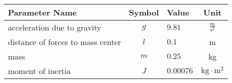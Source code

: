 \begin{tabular}{lclc}
\hline
 Parameter Name                    &  Symbol  & Value     &               Unit                \\
\hline
 acceleration due to gravity       &   $g$    & $9.81$    & $\frac{\mathrm{m}}{\mathrm{s}^2}$ \\
 distance of forces to mass center &   $l$    & $0.1$     &                 m                 \\
 mass                              &   $m$    & $0.25$    &                kg                 \\
 moment of inertia                 &   $J$    & $0.00076$ & $\mathrm{kg} \cdot \mathrm{m}^2$  \\
\hline
\end{tabular}